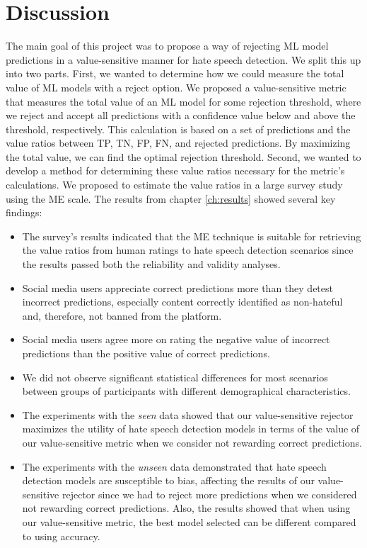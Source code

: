 \chapter{Discussion}
\label{ch:discussion}
The main goal of this project was to propose a way of rejecting ML model predictions in a value-sensitive manner for hate speech detection.
%
We split this up into two parts.
%
First, we wanted to determine how we could measure the total value of ML models with a reject option.
%
We proposed a value-sensitive metric that measures the total value of an ML model for some rejection threshold, where we reject and accept all predictions with a confidence value below and above the threshold, respectively.
%
This calculation is based on a set of predictions and the value ratios between TP, TN, FP, FN, and rejected predictions.
%
By maximizing the total value, we can find the optimal rejection threshold.
%
Second, we wanted to develop a method for determining these value ratios necessary for the metric's calculations.
%
We proposed to estimate the value ratios in a large survey study using the ME scale.
%
The results from chapter \ref{ch:results} showed several key findings:
\begin{itemize}
    \item The survey's results indicated that the ME technique is suitable for retrieving the value ratios from human ratings to hate speech detection scenarios since the results passed both the reliability and validity analyses.
    \item Social media users appreciate correct predictions more than they detest incorrect predictions, especially content correctly identified as non-hateful and, therefore, not banned from the platform.
    \item Social media users agree more on rating the negative value of incorrect predictions than the positive value of correct predictions.
    \item We did not observe significant statistical differences for most scenarios between groups of participants with different demographical characteristics.
    \item The experiments with the \emph{seen} data showed that our value-sensitive rejector maximizes the utility of hate speech detection models in terms of the value of our value-sensitive metric when we consider not rewarding correct predictions.
    \item The experiments with the \emph{unseen} data demonstrated that hate speech detection models are susceptible to bias, affecting the results of our value-sensitive rejector since we had to reject more predictions when we considered not rewarding correct predictions. Also, the results showed that when using our value-sensitive metric, the best model selected can be different compared to using accuracy.
\end{itemize}
%


